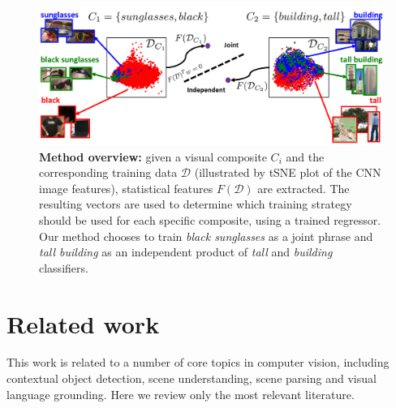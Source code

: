 \documentclass[runningheads]{llncs}
\begin{document}

\begin{figure}
\centering
\includegraphics[width=0.8\linewidth]{teaser5.png}
\caption{{\bf Method overview:} given a visual composite $C_i$ and the corresponding training data $\mathcal{D}$ (illustrated by tSNE plot of the CNN image features), statistical features $F(\mathcal{D})$ are extracted. The resulting vectors are used to determine which training strategy should be used for each specific composite, using a trained regressor. Our method chooses to train {\em black sunglasses} as a joint phrase and {\em tall building} as an independent product of {\em tall} and {\em building} classifiers.} %
\label{fig:teaser}
\vspace{-0.1in}
\end{figure}

\section{Related work}


This work is related to a number of core topics in computer vision, including contextual object detection, scene understanding, scene parsing and visual language grounding. Here we review only the most relevant literature. 
\end{document}
